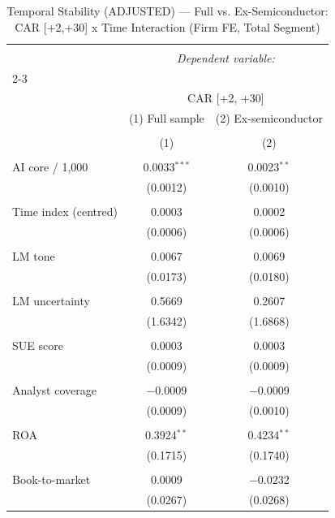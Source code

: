 
\begin{table}[!htbp] \centering 
  \caption{Temporal Stability (ADJUSTED) — Full vs. Ex-Semiconductor: CAR [+2,+30] x Time Interaction (Firm FE, Total Segment)} 
  \label{} 
\begin{tabular}{@{\extracolsep{5pt}}lcc} 
\\[-1.8ex]\hline 
\hline \\[-1.8ex] 
 & \multicolumn{2}{c}{\textit{Dependent variable:}} \\ 
\cline{2-3} 
\\[-1.8ex] & \multicolumn{2}{c}{CAR [+2, +30]} \\ 
 & (1) Full sample & (2) Ex-semiconductor \\ 
\\[-1.8ex] & (1) & (2)\\ 
\hline \\[-1.8ex] 
 AI core / 1,000 & 0.0033$^{***}$ & 0.0023$^{**}$ \\ 
  & (0.0012) & (0.0010) \\ 
  & & \\ 
 Time index (centred) & 0.0003 & 0.0002 \\ 
  & (0.0006) & (0.0006) \\ 
  & & \\ 
 LM tone & 0.0067 & 0.0069 \\ 
  & (0.0173) & (0.0180) \\ 
  & & \\ 
 LM uncertainty & 0.5669 & 0.2607 \\ 
  & (1.6342) & (1.6868) \\ 
  & & \\ 
 SUE score & 0.0003 & 0.0003 \\ 
  & (0.0009) & (0.0009) \\ 
  & & \\ 
 Analyst coverage & $-$0.0009 & $-$0.0009 \\ 
  & (0.0009) & (0.0010) \\ 
  & & \\ 
 ROA & 0.3924$^{**}$ & 0.4234$^{**}$ \\ 
  & (0.1715) & (0.1740) \\ 
  & & \\ 
 Book-to-market & 0.0009 & $-$0.0232 \\ 
  & (0.0267) & (0.0268) \\ 

\end{tabular}
\end{table}
